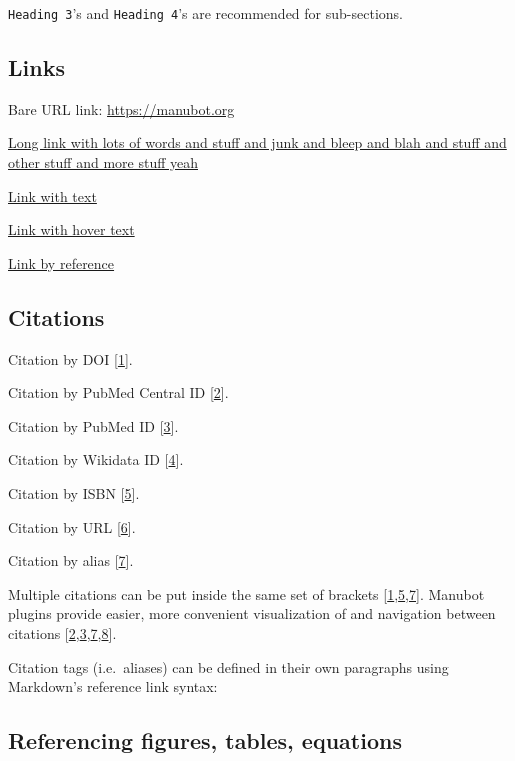 \texttt{Heading\ 3}'s and \texttt{Heading\ 4}'s are recommended for sub-sections.

\hypertarget{links}{%
\subsection{Links}\label{links}}

Bare URL link: \url{https://manubot.org}

\href{https://manubot.org}{Long link with lots of words and stuff and junk and bleep and blah and stuff and other stuff and more stuff yeah}

\href{https://manubot.org}{Link with text}

\href{https://manubot.org}{Link with hover text}

\href{https://manubot.org}{Link by reference}

\hypertarget{citations}{%
\subsection{Citations}\label{citations}}

Citation by DOI {[}\protect\hyperlink{ref-IhliSZDo}{1}{]}.

Citation by PubMed Central ID {[}\protect\hyperlink{ref-mSMVRkoc}{2}{]}.

Citation by PubMed ID {[}\protect\hyperlink{ref-126Wi5Us4}{3}{]}.

Citation by Wikidata ID {[}\protect\hyperlink{ref-QhC8yJ7V}{4}{]}.

Citation by ISBN {[}\protect\hyperlink{ref-zBPP9YKu}{5}{]}.

Citation by URL {[}\protect\hyperlink{ref-1GGGHdsew}{6}{]}.

Citation by alias {[}\protect\hyperlink{ref-PZMP42Ak}{7}{]}.

Multiple citations can be put inside the same set of brackets {[}\protect\hyperlink{ref-IhliSZDo}{1},\protect\hyperlink{ref-zBPP9YKu}{5},\protect\hyperlink{ref-PZMP42Ak}{7}{]}.
Manubot plugins provide easier, more convenient visualization of and navigation between citations {[}\protect\hyperlink{ref-mSMVRkoc}{2},\protect\hyperlink{ref-126Wi5Us4}{3},\protect\hyperlink{ref-PZMP42Ak}{7},\protect\hyperlink{ref-YuJbg3zO}{8}{]}.

Citation tags (i.e.~aliases) can be defined in their own paragraphs using Markdown's reference link syntax:

\hypertarget{referencing-figures-tables-equations}{%
\subsection{Referencing figures, tables, equations}\label{referencing-figures-tables-equations}}

